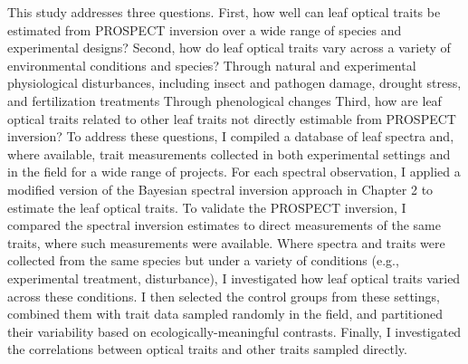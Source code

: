 This study addresses three questions.
First, how well can leaf optical traits be estimated from PROSPECT inversion over a wide range of species and experimental designs?
Second, how do leaf optical traits vary across a variety of environmental conditions and species?
  Through natural and experimental physiological disturbances, including insect and pathogen damage, drought stress, and fertilization treatments
  Through phenological changes
Third, how are leaf optical traits related to other leaf traits not directly estimable from PROSPECT inversion?
To address these questions, I compiled a database of leaf spectra and, where available, trait measurements collected in both experimental settings and in the field for a wide range of projects.
For each spectral observation, I applied a modified version of the Bayesian spectral inversion approach in Chapter 2 to estimate the leaf optical traits.
To validate the PROSPECT inversion, I compared the spectral inversion estimates to direct measurements of the same traits, where such measurements were available.
Where spectra and traits were collected from the same species but under a variety of conditions (e.g., experimental treatment, disturbance), I investigated how leaf optical traits varied across these conditions.
I then selected the control groups from these settings, combined them with trait data sampled randomly in the field, and partitioned their variability based on ecologically-meaningful contrasts.
Finally, I investigated the correlations between optical traits and other traits sampled directly.
